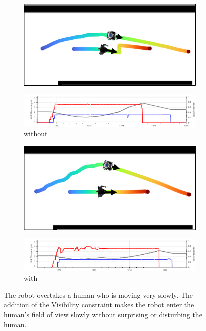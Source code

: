 \begin{figure}[H]
\centering
\begin{subfigure}{0.5\columnwidth}
  \includegraphics[width=\textwidth]{images/appendix/vis/without.png}
\end{subfigure}
\vspace{0.5cm}
\begin{subfigure}{0.8\columnwidth}
  \includegraphics[width=\textwidth]{images/appendix/vis/without1.png}
  \caption{without}
\end{subfigure}

\begin{subfigure}{0.5\columnwidth}
  \includegraphics[width=\textwidth]{images/appendix/vis/with.png}
\end{subfigure}
\begin{subfigure}{0.8\columnwidth}
  \includegraphics[width=\textwidth]{images/appendix/vis/with2.png}
  \caption{with}
\end{subfigure}
\caption{The robot overtakes a human who is moving very slowly. The addition of the Visibility constraint makes the robot enter the human's field of view slowly without surprising or disturbing the human.}
\label{fig:visib_const}
\end{figure}

